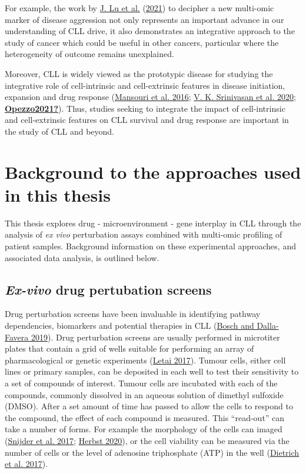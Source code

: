 \documentclass[11pt, a4paper, twosided]{book}
\begin{document}
For example, the work by \protect\hyperlink{ref-Lu2021}{J. Lu et al.} (\protect\hyperlink{ref-Lu2021}{2021}) to decipher a new multi-omic marker of disease aggression not only represents an important advance in our understanding of CLL drive, it also demonstrates an integrative approach to the study of cancer which could be useful in other cancers, particular where the heterogeneity of outcome remains unexplained.

Moreover, CLL is widely viewed as the prototypic disease for studying the integrative role of cell-intrinsic and cell-extrinsic features in disease initiation, expansion and drug response (\protect\hyperlink{ref-Mansouri2016}{Mansouri et al. 2016}; \protect\hyperlink{ref-Srinivasan2020}{V. K. Srinivasan et al. 2020}; \protect\hyperlink{ref-Opezzo2021}{\textbf{Opezzo2021?}}). Thus, studies seeking to integrate the impact of cell-intrinsic and cell-extrinsic features on CLL survival and drug response are important in the study of CLL and beyond.

\hypertarget{background-approaches-intro}{%
\section{Background to the approaches used in this thesis}\label{background-approaches-intro}}

This thesis explores drug - microenvironment - gene interplay in CLL through the analysis of \emph{ex vivo} perturbation assays combined with multi-omic profiling of patient samples. Background information on these experimental approaches, and associated data analysis, is outlined below.

\hypertarget{drug-perturbation-screens-intro}{%
\subsection{\texorpdfstring{\emph{Ex-vivo} drug pertubation screens}{Ex-vivo drug pertubation screens}}\label{drug-perturbation-screens-intro}}

Drug perturbation screens have been invaluable in identifying pathway dependencies, biomarkers and potential therapies in CLL (\protect\hyperlink{ref-Bosch2019}{Bosch and Dalla-Favera 2019}). Drug perturbation screens are usually performed in microtiter plates that contain a grid of wells suitable for performing an array of pharmacological or genetic experiments (\protect\hyperlink{ref-Letai2017}{Letai 2017}). Tumour cells, either cell lines or primary samples, can be deposited in each well to test their sensitivity to a set of compounds of interest. Tumour cells are incubated with each of the compounds, commonly dissolved in an aqueous solution of dimethyl sulfoxide (DMSO). After a set amount of time has passed to allow the cells to respond to the compound, the effect of each compound is measured. This ``read-out'' can take a number of forms. For example the morphology of the cells can imaged (\protect\hyperlink{ref-Snijder2017}{Snijder et al. 2017}; \protect\hyperlink{ref-HerbstThesis}{Herbst 2020}), or the cell viability can be measured via the number of cells or the level of adenosine triphosphate (ATP) in the well (\protect\hyperlink{ref-JCIpaper}{Dietrich et al. 2017}).
\end{document}
